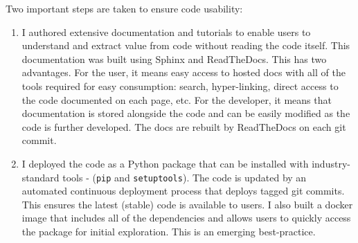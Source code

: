 \documentclass[../main.tex]{subfiles}
\begin{document}
Two important steps are taken to ensure code usability:

\begin{enumerate}
    \item I authored extensive documentation and tutorials to enable users to understand and extract value from code without reading the code itself. This documentation was built using Sphinx and ReadTheDocs. This has two advantages. For the user, it means easy access to hosted docs with all of the tools required for easy consumption: search, hyper-linking, direct access to the code documented on each page, etc. For the developer, it means that documentation is stored alongside the code and can be easily modified as the code is further developed. The docs are rebuilt by ReadTheDocs on each git commit.
    
    \item I deployed the code as a Python package that can be installed with industry-standard tools - (\texttt{pip} and \texttt{setuptools}). The code is updated by an automated continuous deployment process that deploys tagged git commits. This ensures the latest (stable) code is available to users. I also built a docker image that includes all of the dependencies and allows users to quickly access the package for initial exploration. This is an emerging best-practice.
    
\end{enumerate}

\end{document}
